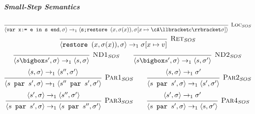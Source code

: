 \subparagraph{Small-Step Semantics}
\[
    \begin{prooftree}
        \infer0[\textsc{Loc}$_{SOS}$]{\langle \texttt{var x:= e in s end}, \sigma \rangle \rightarrow_1 \langle \texttt{s;restore }(x, \sigma(x)),
            \sigma[x \mapsto \cA \llbracket e \rrbracket \sigma] \rangle}
    \end{prooftree}
\]
\[
    \begin{prooftree}
        \infer0[\textsc{Ret}$_{SOS}$]{\langle \texttt{restore }(x, \sigma(x)), \sigma \rangle \rightarrow_1 \sigma[x \mapsto v]}
    \end{prooftree}
\]
\[
    \begin{prooftree}
        \infer0[\textsc{ND1}$_{SOS}$]{\langle s \bigbox s', \sigma \rangle \rightarrow_1 \langle s, \sigma \rangle}
    \end{prooftree}
    \qquad
    \begin{prooftree}
        \infer0[\textsc{ND2}$_{SOS}$]{\langle s \bigbox s', \sigma \rangle \rightarrow_1 \langle s, \sigma' \rangle}
    \end{prooftree}
\]
\[
    \begin{prooftree}
        \hypo{\langle s, \sigma \rangle \rightarrow_1 \langle s'', \sigma' \rangle}
        \infer1[\textsc{Par1}$_{SOS}$]{\langle s \texttt{ par } s', \sigma \rangle \rightarrow_1 \langle s'' \texttt{ par } s', \sigma' \rangle}
    \end{prooftree}
    \qquad
    \begin{prooftree}
        \hypo{\langle s, \sigma \rangle \rightarrow_1 \sigma'}
        \infer1[\textsc{Par2}$_{SOS}$]{\langle s \texttt{ par } s', \sigma \rangle \rightarrow_1 \langle s', \sigma' \rangle}
    \end{prooftree}
\]
\[
    \begin{prooftree}
        \hypo{\langle s', \sigma \rangle \rightarrow_1 \langle s'', \sigma' \rangle}
        \infer1[\textsc{Par3}$_{SOS}$]{\langle s \texttt{ par } s', \sigma \rangle \rightarrow_1 \langle s \texttt{ par } s'', \sigma' \rangle}
    \end{prooftree}
    \qquad
    \begin{prooftree}
        \hypo{\langle s', \sigma \rangle \rightarrow_1 \sigma'}
        \infer1[\textsc{Par4}$_{SOS}$]{\langle s \texttt{ par } s', \sigma \rangle \rightarrow_1 \langle s, \sigma' \rangle}
    \end{prooftree}
\]
